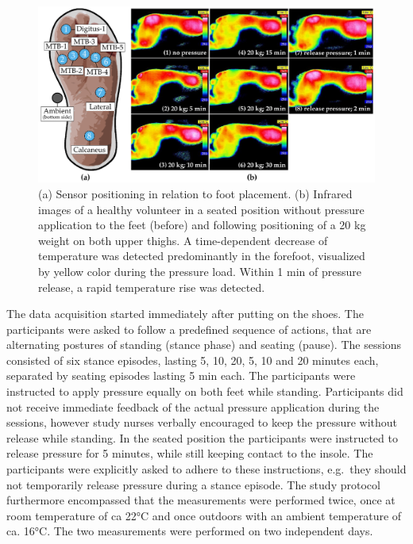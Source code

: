 \documentclass[
  oneside]{book}
\begin{document}
\begin{figure}
\includegraphics[width=1\linewidth]{figures/02-df-infrared-sole-sensor-positions} \caption[fig.scap]{(a) Sensor positioning in relation to foot placement. (b) Infrared images of a healthy volunteer in a seated position without pressure application to the feet (before) and following positioning of a 20 kg weight on both upper thighs. A time-dependent decrease of temperature was detected predominantly in the forefoot, visualized by yellow color during the pressure load. Within 1 min of pressure release, a rapid temperature rise was detected.}\label{fig:02-df-infrared-sole-sensor-positions-plot}
\end{figure}

The data acquisition started immediately after putting on the shoes.
The participants were asked to follow a predefined sequence of actions, that are alternating postures of standing (stance phase) and seating (pause).
The sessions consisted of six stance episodes, lasting 5, 10, 20, 5, 10 and 20 minutes each, separated by seating episodes lasting 5 min each.
The participants were instructed to apply pressure equally on both feet while standing.
Participants did not receive immediate feedback of the actual pressure application during the sessions, however study nurses verbally encouraged to keep the pressure without release while standing.
In the seated position the participants were instructed to release pressure for 5 minutes, while still keeping contact to the insole.
The participants were explicitly asked to adhere to these instructions, e.g.~they should not temporarily release pressure during a stance episode.
The study protocol furthermore encompassed that the measurements were performed twice, once at room temperature of ca 22°C and once outdoors with an ambient temperature of ca. 16°C.
The two measurements were performed on two independent days.
\end{document}
